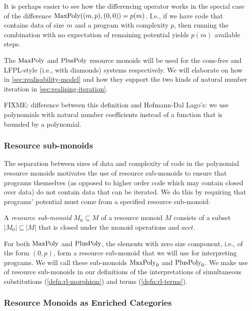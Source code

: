 \documentclass[acmsmall,review]{acmart}
\begin{document}
It is perhaps easier to see how the differencing operator works in the
special case of the difference $\mathrm{MaxPoly}((m,p),(0,0)) = p(m)$. I.e.,
if we have code that contains data of size $m$ and a program with
complexity $p$, then running the combination with no expectation of
remaining potential yields $p(m)$ available steps.

The $\mathrm{MaxPoly}$ and $\mathrm{PlusPoly}$ resource monoids will be used for the
cons-free and LFPL-style (i.e., with diamonds) systems
respectively. We will elaborate on how in
\autoref{sec:realisability-model} and how they support the two kinds
of natural number iteration in \autoref{sec:realising-iteration}.

FIXME: difference between this definition and Hofmann-Dal Lago's: we
use polynomials with natural number coefficients instead of a function
that is bounded by a polynomial.

\subsubsection{Resource sub-monoids}

The separation between sizes of data and complexity of code in the
polynomial resource monoids motivates the use of resource sub-monoids
to ensure that programs themselves (as opposed to higher order code
which may contain closed over data) do not contain data that can be
iterated. We do this by requiring that programs' potential must come
from a specified resource sub-monoid:

\begin{definition}
  A \emph{resource sub-monoid} $M_0 \subseteq M$ of a resource monoid
  $M$ consists of a subset $|M_0| \subseteq |M|$ that is closed under
  the monoid operations and $\mathit{acct}$.
\end{definition}

For both $\mathrm{MaxPoly}$ and $\mathrm{PlusPoly}$, the elements with zero size
component, i.e., of the form $(0,p)$, form a resource sub-monoid that
we will use for interpreting programs. We will call these sub-monoids
$\mathrm{MaxPoly}_0$ and $\mathrm{PlusPoly}_0$. We make use of resource sub-monoids
in our definitions of the interpretations of simultaneous
substitutions (\autoref{defn:rl-morphism}) and terms
(\autoref{defn:rl-terms}).

\subsubsection{Resource Monoids as Enriched Categories}
\end{document}
